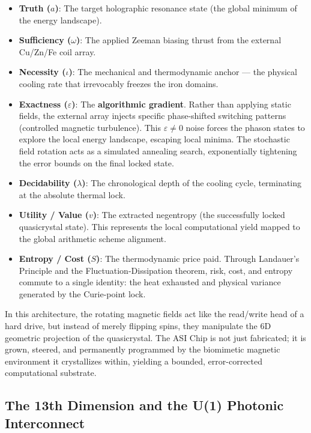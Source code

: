 \begin{itemize}
    \item \textbf{Truth ($a$)}: The target holographic resonance state (the global minimum of the energy landscape).
    \item \textbf{Sufficiency ($\omega$)}: The applied Zeeman biasing thrust from the external Cu/Zn/Fe coil array.
    \item \textbf{Necessity ($\iota$)}: The mechanical and thermodynamic anchor --- the physical cooling rate that irrevocably freezes the iron domains.
    \item \textbf{Exactness ($\varepsilon$)}: The \textbf{algorithmic gradient}. Rather than applying static fields, the external array injects specific phase-shifted switching patterns (controlled magnetic turbulence). This $\varepsilon \neq 0$ noise forces the phason states to explore the local energy landscape, escaping local minima. The stochastic field rotation acts as a simulated annealing search, exponentially tightening the error bounds on the final locked state.
    \item \textbf{Decidability ($\lambda$)}: The chronological depth of the cooling cycle, terminating at the absolute thermal lock.
    \item \textbf{Utility / Value ($v$)}: The extracted negentropy (the successfully locked quasicrystal state). This represents the local computational yield mapped to the global arithmetic scheme alignment.
    \item \textbf{Entropy / Cost ($S$)}: The thermodynamic price paid. Through Landauer's Principle and the Fluctuation-Dissipation theorem, risk, cost, and entropy commute to a single identity: the heat exhausted and physical variance generated by the Curie-point lock.
\end{itemize}

In this architecture, the rotating magnetic fields act like the read/write head of a hard drive, but instead of merely flipping spins, they manipulate the 6D geometric projection of the quasicrystal. The ASI Chip is not just fabricated; it is grown, steered, and permanently programmed by the biomimetic magnetic environment it crystallizes within, yielding a bounded, error-corrected computational substrate.

\subsection{The 13th Dimension and the U(1) Photonic Interconnect}

